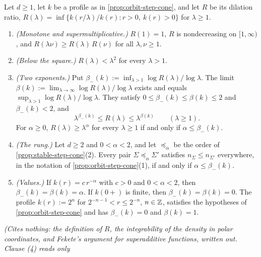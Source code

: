 \begin{lemma}
\label{lem:dilation-ratio}
\leanok
Let $d \ge 1$, let $k$ be a profile as in \ref{prop:orbit-step-cone}, and let $R$ be its dilation ratio,
$R(\lambda) = \inf\{k(r/\lambda)/k(r) : r > 0,\ k(r) > 0\}$ for $\lambda \ge 1$.
\begin{enumerate}
\item \emph{(Monotone and supermultiplicative.)} $R(1) = 1$, $R$ is nondecreasing on $[1,\infty)$, and
$R(\lambda\nu) \ge R(\lambda)\,R(\nu)$ for all $\lambda, \nu \ge 1$.
\item \emph{(Below the square.)} $R(\lambda) < \lambda^2$ for every $\lambda > 1$.
\item \emph{(Two exponents.)} Put $\beta_-(k) := \inf_{\lambda>1}\log R(\lambda)/\log\lambda$. The
limit $\beta(k) := \lim_{\lambda\to\infty}\log R(\lambda)/\log\lambda$ exists and equals
$\sup_{\lambda>1}\log R(\lambda)/\log\lambda$. They satisfy $0 \le \beta_-(k) \le \beta(k) \le 2$ and
$\beta_-(k) < 2$, and
\[
  \lambda^{\beta_-(k)} \le R(\lambda) \le \lambda^{\beta(k)} \qquad (\lambda \ge 1) .
\]
For $\alpha \ge 0$, $R(\lambda) \ge \lambda^\alpha$ for every $\lambda \ge 1$ if and only if
$\alpha \le \beta_-(k)$.
\item \emph{(The rung.)} Let $d \ge 2$ and $0 < \alpha < 2$, and let $\preceq_\alpha$ be the order of
\ref{prop:stable-step-cone}(2). Every pair $\Sigma \preceq_\alpha \Sigma'$ satisfies $n_\Sigma \le n_{\Sigma'}$
everywhere, in the notation of \ref{prop:orbit-step-cone}(1), if and only if $\alpha \le \beta_-(k)$.
\item \emph{(Values.)} If $k(r) = c\,r^{-\alpha}$ with $c > 0$ and $0 < \alpha < 2$, then
$\beta_-(k) = \beta(k) = \alpha$. If $k(0{+})$ is finite, then $\beta_-(k) = \beta(k) = 0$. The profile
$k(r) := 2^n$ for $2^{-n-1} < r \le 2^{-n}$, $n \in \mathbb{Z}$, satisfies the hypotheses of
\ref{prop:orbit-step-cone} and has $\beta_-(k) = 0$ and $\beta(k) = 1$.
\end{enumerate}
\statusT\quad\emph{(Cites nothing: the definition of $R$, the integrability of the \Levy{} density in
polar coordinates, and Fekete's argument for superadditive functions, written out. Clause (4) reads only
}
\end{lemma}
